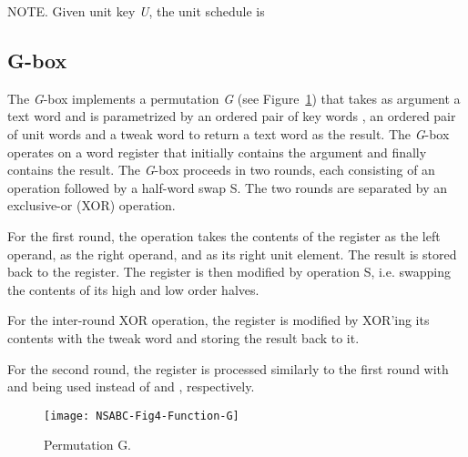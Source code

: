 \documentclass[a4paper,oneside,english]{amsart}
\numberwithin{equation}{section}
\numberwithin{figure}{section}
\begin{document}
NOTE. Given unit key \emph{U}, the unit schedule is





\subsection{G-box}

The \emph{G}-box implements a permutation \emph{G} (see Figure~\ref{fig:Permutation-G})
that takes as argument a text word and is parametrized by an ordered
pair of key words , an ordered pair of unit words
 and a tweak word  to return a text word as
the result. The \emph{G}-box operates on a word register that initially
contains the argument and finally contains the result. The \emph{G}-box
proceeds in two rounds, each consisting of an operation 
followed by a half-word swap S. The two rounds are separated by an
exclusive-or (XOR) operation.

For the first round, the operation  takes
the contents of the register as the left operand,  as the
right operand, and  as its right unit element. The result
is stored back to the register. The register is then modified by operation
S, i.e. swapping the contents of its high and low order halves.

For the inter-round XOR operation, the register is modified by XOR'ing
its contents with the tweak word  and storing the result back
to it.

For the second round, the register is processed similarly to the first
round with  and  being used instead of  and
, respectively.

\begin{figure}
{\footnotesize \texttt{[image: NSABC-Fig4-Function-G]}}{\footnotesize \par}

\caption{\label{fig:Permutation-G}Permutation G.}
\end{figure}
\end{document}
